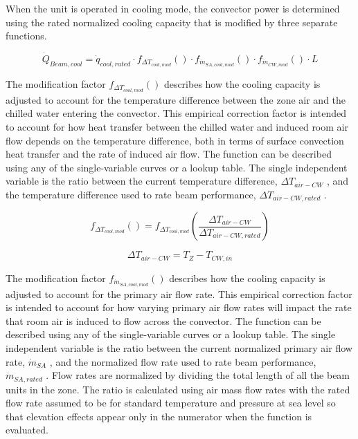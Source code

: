 When the unit is operated in cooling mode, the convector power is determined using the rated normalized cooling capacity that is modified by three separate functions.

\begin{equation}
{\dot Q_{Beam, cool}} = { \dot q_{cool,rated} \cdot f_{ \Delta T_{cool,mod} }() \cdot f_{\dot m_{SA,cool,mod}}() \cdot f_{\dot m_{CW,mod}}() \cdot L }
\end{equation}

The modification factor \({f_{ \Delta T_{cool,mod} }() }\) describes how the cooling capacity is adjusted to account for the temperature difference between the zone air and the chilled water entering the convector. This empirical correction factor is intended to account for how heat transfer between the chilled water and induced room air flow depends on the temperature difference, both in terms of surface convection heat transfer and the rate of induced air flow. The function can be described using any of the single-variable curves or a lookup table. The single independent variable is the ratio between the current temperature difference, \({\Delta T_{air-CW}}\) , and the temperature difference used to rate beam performance, \({\Delta T_{air-CW,rated}}\) .

\begin{equation}
{f_{ \Delta T_{cool,mod} }() } = f_{ \Delta T_{cool,mod} }\left(\frac{\Delta T_{air-CW}}{\Delta T_{air-CW,rated}}\right)
\end{equation}

\begin{equation}
{\Delta T_{air-CW}} = {T_{Z}}-{T_{CW,in}}
\end{equation}

The modification factor \({f_{\dot m_{SA,cool,mod}}()}\) describes how the cooling capacity is adjusted to account for the primary air flow rate. This empirical correction factor is intended to account for how varying primary air flow rates will impact the rate that room air is induced to flow across the convector. The function can be described using any of the single-variable curves or a lookup table. The single independent variable is the ratio between the current normalized primary air flow rate, \({\dot m_{SA}}\) , and the normalized flow rate used to rate beam performance, \({\dot m_{SA,rated}}\) . Flow rates are normalized by dividing the total length of all the beam units in the zone. The ratio is calculated using air mass flow rates with the rated flow rate assumed to be for standard temperature and pressure at sea level so that elevation effects appear only in the numerator when the function is evaluated.

